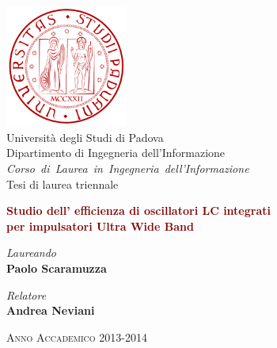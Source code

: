 \documentclass[tex/tesi.tex]{subfiles}
\begin{document}
\begin{center}
	\includegraphics[height=4cm]{images/logounipd} \\
	\vspace{0.4cm}
	\Large{Università degli Studi di Padova} \\
	\vspace{0.5cm}
	\Large{Dipartimento di Ingegneria dell'Informazione} \\
	\vspace{1.5cm}
	\emph{\Large{Corso~di~Laurea~in~Ingegneria~dell'Informazione}} \\
	\vspace{0.5cm}
	\Large{Tesi di laurea triennale} \\
\begin{vplace} %
	\LARGE{\textbf{\textcolor{Maroon}{
		Studio dell' efficienza di oscillatori LC integrati \\ per impulsatori 
		Ultra Wide Band}}}
\end{vplace}
\end{center}

\vfill
\noindent
\begin{minipage}{0.5\textwidth}
\begin{flushleft}
	\large{\textit{Laureando}} \\
	\Large{\textbf{Paolo Scaramuzza}}
\end{flushleft}
\end{minipage}
\noindent
\begin{minipage}{0.5\textwidth}
\begin{flushright}
	\large{\textit{Relatore}} \\
	\Large{\textbf{Andrea Neviani}}
\end{flushright}
\end{minipage}

\vfill
\begin{center}
\textsc{Anno Accademico 2013-2014}
\end{center}
\restoregeometry
\end{document}
